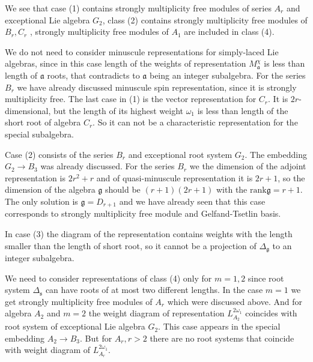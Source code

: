 \documentclass{article}
\newcommand{\gf}{\mathfrak{g}}
\newcommand{\af}{\mathfrak{a}}
\newcommand{\sfr}{\mathfrak{s}}
\begin{document}
We see that case (1) contains strongly multiplicity free modules of series $A_{r}$ and exceptional
Lie algebra $G_{2}$, class (2) contains strongly multiplicity free modules of $ B_{r}, C_{r}$ ,
strongly multiplicity free modules of $A_{1}$ are included in class (4).

We do not need to consider minuscule representations for simply-laced Lie algebras, since in this
case length of the weights of representation $M^{\chi}_{\af}$ is less than length of $\af$ roots,
that contradicts to $\af$ being an integer subalgebra. For the series $B_{r}$ we have already
discussed minuscule spin representation, since it is strongly multiplicity free. The last case in
(1) is the vector representation for $C_{r}$. It is $2r$-dimensional, but the length of its highest weight $\omega_{1}$ is less
than length of the short root of algebra $C_{r}$. So it can not be a characteristic representation
for the special subalgebra. 

Case (2) consists of the series $B_{r}$ and exceptional root system $G_{2}$. The embedding $G_{2}\to
B_{3}$ was already discussed. 
For the series $B_{r}$ we the dimension of the adjoint representation
is $2r^{2}+r$ and of quasi-minuscule representation it is $2r+1$, so the dimension of the algebra
$\gf$ should be $(r+1)(2r+1)$ with the $\mathrm{rank}\gf=r+1$. The only solution is $\gf=D_{r+1}$
and we have already seen that this case corresponds to strongly multiplicity free module and
Gelfand-Tsetlin basis.

In case (3) the diagram of the representation contains weights with the length smaller than the
length of short root, so it cannot be a projection of $\Delta_{\gf}$ to an integer subalgebra. 

We need to consider representations of class (4) only for $m=1,2$ since root system $\Delta_{\sfr}$
can have roots of at most two different lengths. In the case $m=1$ we get strongly multiplicity free
modules of $A_{r}$ which were discussed above. And for algebra $A_{2}$ and $m=2$ the weight diagram
of representation $L^{2\omega_{1}}_{A_{2}}$ coincides with root system of exceptional Lie algebra
$G_{2}$. This case appears in the special embedding $A_{2}\to B_{3}$. But for $A_{r}, r>2$ there are
no root systems that coincide with weight diagram of $L^{2\omega_{1}}_{A_{r}}$. 
\end{document}
